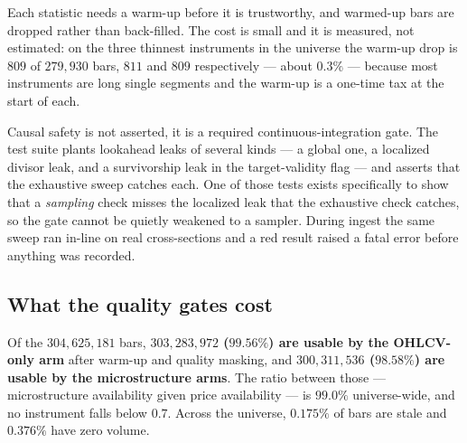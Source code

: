 Each statistic needs a warm-up before it is trustworthy, and warmed-up bars are dropped rather than
back-filled. The cost is small and it is measured, not estimated: on the three thinnest instruments
in the universe the warm-up drop is $809$ of $279{,}930$ bars, $811$ and $809$ respectively ---
about $0.3\%$ --- because most instruments are long single segments and the warm-up is a one-time
tax at the start of each.

Causal safety is not asserted, it is a required continuous-integration gate. The test suite plants
lookahead leaks of several kinds --- a global one, a localized divisor leak, and a survivorship
leak in the target-validity flag --- and asserts that the exhaustive sweep catches each. One of
those tests exists specifically to show that a \emph{sampling} check misses the localized leak that
the exhaustive check catches, so the gate cannot be quietly weakened to a sampler. During ingest
the same sweep ran in-line on real cross-sections and a red result raised a fatal error before
anything was recorded.

\subsection{What the quality gates cost}
\label{sec:data-quality}

Of the $304{,}625{,}181$ bars, \textbf{$303{,}283{,}972$ ($99.56\%$) are usable by the OHLCV-only
arm} after warm-up and quality masking, and \textbf{$300{,}311{,}536$ ($98.58\%$) are usable by the
microstructure arms}. The ratio between those --- microstructure availability given price
availability --- is $99.0\%$ universe-wide, and no instrument falls below $0.7$. Across the
universe, $0.175\%$ of bars are stale and $0.376\%$ have zero volume.

